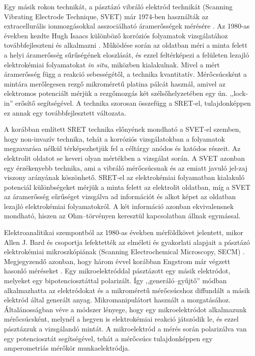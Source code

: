 Egy másik rokon technikát, a pásztázó vibráló elektród technikát (Scanning Vibrating Electrode Technique, SVET) már 1974-ben használták az extracellurális ionmozgásokkal asszociálható áramerősségek mérésére \cite{jaffe1974ultrasensitive}. Az 1980-as években kezdte Hugh Isaacs különböző korróziós folyamatok vizsgálatához továbbfejleszteni és alkalmazni \cite{isaacs1988initiation}. Működése során az oldatban méri a minta felett a helyi áramerősség sűrűségének eloszlását, és ezzel feltérképezi a felületen lezajló elektrokémiai folyamatokat \emph{in situ}, miközben kialakulnak. Mivel a mért áramerősség függ a reakció sebességétől, a technika kvantitatív. Mérőcsúcsként a mintára merőlegesen rezgő mikroméretű platina pálcát használ, amivel az elektromos potenciált mérjük a rezgőmozgás két szélsőhelyzetében egy ún. ,,lock-in'' erősítő segítségével. A technika szorosan összefügg a SRET-el, tulajdonképpen ez annak egy továbbfejlesztett változata. 

A korábban említett SRET technika előnyének mondható a SVET-el szemben, hogy non-invazív technika, tehát a korróziós vizsgálatokban a folyamatok megzavarása nélkül térképezhetjük fel a céltárgy anódos és katódos részeit. Az elektrolit oldatot se keveri olyan mértékben a vizsgálat során. A SVET azonban egy érzékenyebb technika, ami a vibráló mérőcsúcsnak és az emiatt javuló jel-zaj viszony arányának köszönhető. SRET-el az elektrokémiai folyamatban kialakuló potenciál különbségeket mérjük a minta felett az elektrolit oldatban, míg a SVET az áramerősség sűrűséget vizsgálva ad információt és alkot képet az oldatban lezajló elektrokémiai folyamatokról. A két információ azonban ekvivalensnek mondható, hiszen az Ohm--törvényen keresztül kapcsolatban állnak egymással.

Elektroanalitikai szempontból az 1980-as években mérföldkövet jelentett, mikor Allen J. Bard és csoportja lefektették az elméleti és gyakorlati alapjait a pásztázó elektrokémiai mikroszkópiának (Scanning Electrochemical Microscopy, SECM) \cite{bard1989scanning,bard1990scanning}. Megjegyzendő azonban, hogy három évvel korábban Engstrom már végzett hasonló méréseket \cite{engstrom1989scanning}. Egy mikroelektróddal pásztázott egy másik elektródot, melyeket egy bipotenciosztáttal polarizált. Így ,,generáló--gyűjtő'' módban alkalmazhatta az elektródokat és a mikroméretű mérőcsúcshoz diffundált a másik elektród által generált anyag. Mikromanipulátort használt a mozgatásához. Általánosságban véve a módszer lényege, hogy egy mikroelektródot alkalmazunk mérőcsúcsként, melynél a hegyen is elektrokémiai reakció játszódik le, és ezzel pásztázzuk a vizsgálandó mintát. A mikroelektród a mérés során polarizálva van egy potenciosztát segítségével, tehát a mérőcsúcs tulajdonképpen egy amperometriás mérőkör munkaelektródja. 


